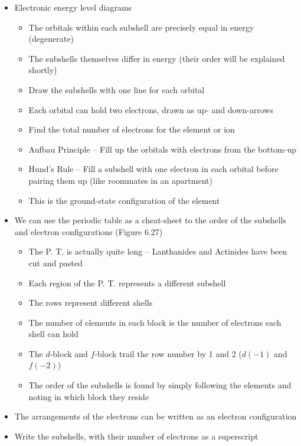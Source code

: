 \documentclass[12pt, openany, letterpaper]{memoir}
\begin{document}
\begin{itemize}
  \item Electronic energy level diagrams 
  \begin{itemize}
    \item The orbitals within each subshell are precisely equal in energy (degenerate)
    \item The subshells themselves differ in energy (their order will be explained shortly)
    \item Draw the subshells with one line for each orbital
    \item Each orbital can hold two electrons, drawn as up- and down-arrows
    \item Find the total number of electrons for the element or ion
    \item Aufbau Principle -- Fill up the orbitals with electrons from the bottom-up
    \item Hund's Rule -- Fill a subshell with one electron in each orbital before pairing them up (like roommates in an apartment)
    \item This is the ground-state configuration of the element
  \end{itemize}
  \item We can use the periodic table as a cheat-sheet to the order of the subshells and electron configurations (Figure 6.27)
    \begin{itemize}
      \item The P. T. is actually quite long -- Lanthanides and Actinides have been cut and pasted
      \item Each region of the P. T. represents a different subshell
      \item The rows represent different shells
      \item The number of elements in each block is the number of electrons each shell can hold
      \item The $d$-block and $f$-block trail the row number by 1 and 2 ($d(-1)$ and $f(-2)$)
      \item The order of the subshells is found by simply following the elements and noting in which block they reside
    \end{itemize}
	\item The arrangements of the electrons can be written as an electron configuration
	\item Write the subshells, with their number of electrons as a superscript


\end{itemize}
\end{document}
